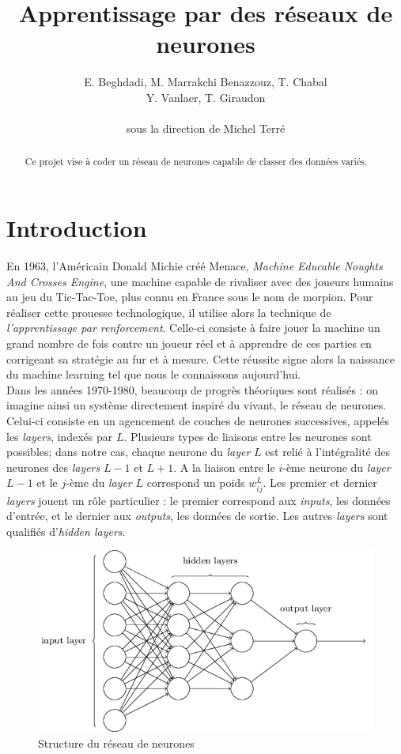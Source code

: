 \documentclass[a4paper,10pt]{article}
\title{Apprentissage par des réseaux de neurones}
\author{E. Beghdadi, M. Marrakchi Benazzouz, T. Chabal \\ Y. Vanlaer, T. Giraudon \\  \\ sous la direction de Michel Terré}
\begin{document}
\maketitle

\begin{abstract}
Ce projet vise à coder un réseau de neurones capable de classer des données variés.

\end{abstract}

\section{Introduction}
En 1963, l'Américain Donald Michie créé Menace, \textit{Machine Educable Noughts And Crosses Engine},
une machine capable de rivaliser avec des joueurs humains au jeu du Tic-Tac-Toe, plus connu en France sous le nom de morpion.
Pour réaliser cette prouesse technologique, il utilise alors la technique de \textit{l'apprentissage par renforcement}.
Celle-ci consiste à faire jouer la machine un grand nombre de fois contre un joueur réel et à apprendre de ces parties
en corrigeant sa stratégie au fur et à mesure. Cette réussite signe alors la naissance du machine learning tel que
nous le connaissons aujourd'hui. \\
Dans les années 1970-1980, beaucoup de progrès théoriques sont réalisés : on imagine ainsi un système
directement inspiré du vivant, le réseau de neurones. Celui-ci consiste en un agencement de couches de neurones successives,
appelés les \textit{layers}, indexés par $L$. Plusieurs types de liaisons entre les neurones sont possibles; dans notre cas, chaque neurone du
\textit{layer} $L$ est relié à l'intégralité des neurones des \textit{layers} $L-1$ et $L+1$. A la liaison entre
le $i$-ème neurone du \textit{layer} $L-1$ et le $j$-ème du \textit{layer} $L$ correspond un poids $w^L_{ij}$. Les premier et dernier \textit{layers}
jouent un rôle particulier : le premier correspond aux \textit{inputs}, les données d'entrée, et le dernier aux \textit{outputs},
les données de sortie. Les autres \textit{layers} sont qualifiés d'\textit{hidden layers}.
\\

\begin{figure}[H]
\centering
\includegraphics[scale = 0.4]{layers}
\caption{Structure du réseau de neurones}
 
\end{figure}
\end{document}
